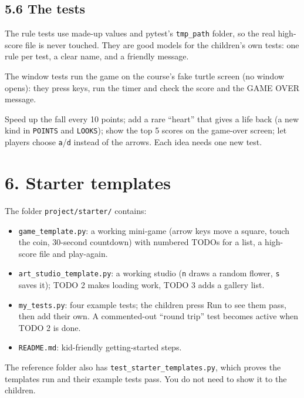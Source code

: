 \documentclass[level=2,teacher]{kidscode}
\begin{document}
\subsection{5.6 The tests}
The rule tests use made-up values and pytest's \texttt{tmp\_path} folder, so the real high-score file is
never touched. They are good models for the children's own tests: one rule per test, a clear name,
and a friendly message.

The window tests run the game on the course's fake turtle screen (no window opens): they press keys,
run the timer and check the score and the GAME OVER message.

\begin{stretchchallenge}
Speed up the fall every 10 points; add a rare \enquote{heart} that gives a life back (a new kind in
\texttt{POINTS} and \texttt{LOOKS}); show the top 5 scores on the game-over screen; let players choose
\texttt{a}/\texttt{d} instead of the arrows. Each idea needs one new test.
\end{stretchchallenge}

\section{6. Starter templates}
The folder \texttt{project/starter/} contains:
\begin{itemize}[itemsep=1pt]
  \item \texttt{game\_template.py}: a working mini-game (arrow keys move a square, touch the coin,
        30-second countdown) with numbered TODOs for a list, a high-score file and play-again.
  \item \texttt{art\_studio\_template.py}: a working studio (\texttt{n} draws a random flower, \texttt{s} saves it);
        TODO 2 makes loading work, TODO 3 adds a gallery list.
  \item \texttt{my\_tests.py}: four example tests; the children press Run to see them pass, then add
        their own. A commented-out \enquote{round trip} test becomes active when TODO 2 is done.
  \item \texttt{README.md}: kid-friendly getting-started steps.
\end{itemize}
The reference folder also has \texttt{test\_starter\_templates.py}, which proves the templates run and
their example tests pass. You do not need to show it to the children.
\end{document}

